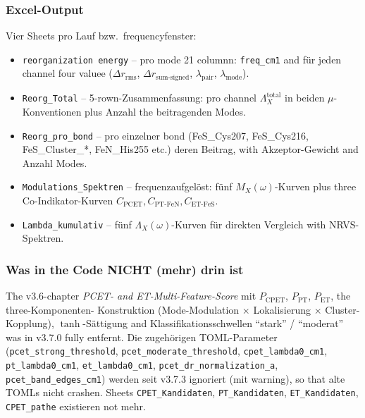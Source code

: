 \documentclass[11pt,a4paper,twoside]{article}
\theoremstyle{remark}
\begin{document}
\subsubsection*{Excel-Output}
\label{sec:reorg-excel}

Vier Sheets pro Lauf bzw.\ frequencyfenster:

\begin{itemize}
  \item \texttt{reorganization energy} -- pro mode 21 columnn:
        \texttt{freq\_cm1} and f\"ur jeden channel four valuee
        ($\Delta r_\text{rms}$, $\Delta r_\text{sum-signed}$,
        $\lambda_\text{pair}$, $\lambda_\text{mode}$).

  \item \texttt{Reorg\_Total} -- 5-rown-Zusammenfassung: pro channel
        $\Lambda_X^\text{total}$ in beiden $\mu$-Konventionen plus
        Anzahl the beitragenden Modes.

  \item \texttt{Reorg\_pro\_bond} -- pro einzelner bond
        (FeS\_Cys207, FeS\_Cys216, FeS\_Cluster\_*, FeN\_His255 etc.)
        deren Beitrag, with Akzeptor-Gewicht and Anzahl Modes.

  \item \texttt{Modulations\_Spektren} -- frequenzaufgel\"ost: f\"unf
        $M_X(\omega)$-Kurven plus three Co-Indikator-Kurven
        $C_\text{PCET}, C_\text{PT-FeN}, C_\text{ET-FeS}$.

  \item \texttt{Lambda\_kumulativ} -- f\"unf $\Lambda_X(\omega)$-Kurven
        f\"ur direkten Vergleich with NRVS-Spektren.
\end{itemize}

\subsubsection*{Was in the Code NICHT (mehr) drin ist}

The v3.6-chapter \emph{PCET- and ET-Multi-Feature-Score} mit
$P_\text{CPET}$, $P_\text{PT}$, $P_\text{ET}$, the three-Komponenten-
Konstruktion (Mode-Modulation $\times$ Lokalisierung $\times$
Cluster-Kopplung), $\tanh$-S\"attigung and Klassifikationsschwellen
"`stark"' / "`moderat"' was in v3.7.0 fully entfernt. Die
zugeh\"origen TOML-Parameter (\texttt{pcet\_strong\_threshold},
\texttt{pcet\_moderate\_threshold}, \texttt{cpet\_lambda0\_cm1},
\texttt{pt\_lambda0\_cm1}, \texttt{et\_lambda0\_cm1},
\texttt{pcet\_dr\_normalization\_a}, \texttt{pcet\_band\_edges\_cm1})
werden seit v3.7.3 ignoriert (mit warning), so that alte TOMLs nicht
crashen. Sheets \texttt{CPET\_Kandidaten}, \texttt{PT\_Kandidaten},
\texttt{ET\_Kandidaten}, \texttt{CPET\_pathe} existieren not mehr.
\end{document}
